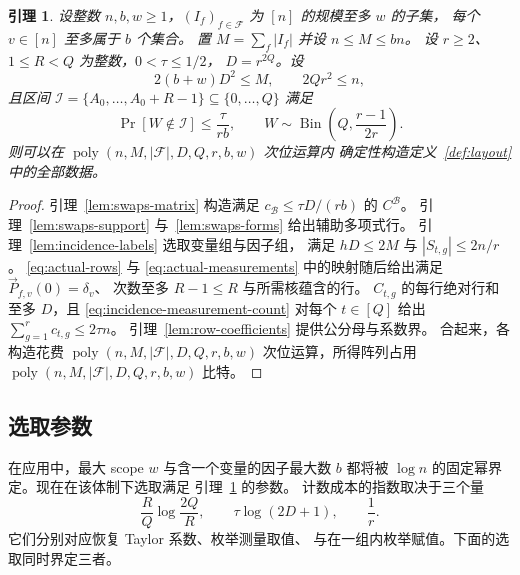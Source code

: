 \documentclass[11pt,reqno]{amsart}
\numberwithin{equation}{section}
\newtheorem{lemma}[theorem]{引理}
\theoremstyle{definition}\newtheorem{definition}[theorem]{定义}
\theoremstyle{remark}\newtheorem{remark}[theorem]{注}
\newcommand{\poly}{\operatorname{poly}}
\renewcommand{\le}{\leqslant}
\renewcommand{\ge}{\geqslant}
\begin{document}
\begin{lemma}\label{lem:layout}
设整数 $n,b,w\ge1$，$(I_f)_{f\in\mathcal F}$
为 $[n]$ 的规模至多 $w$ 的子集，
每个 $v\in[n]$ 至多属于 $b$ 个集合。
置 $M=\sum_f|I_f|$ 并设 $n\le M\le bn$。
设 $r\ge2$、$1\le R<Q$ 为整数，$0<\tau\le1/2$，
$D=r^{2Q}$。设
\[
 2(b+w)D^2\le M,\qquad 2Qr^2\le n,
\]
且区间
$\mathcal I=\{A_0,\ldots,A_0+R-1\}\subseteq\{0,\ldots,Q\}$
满足
\[
 \Pr[W\notin\mathcal I]\le\frac{\tau}{rb},\qquad
 W\sim\operatorname{Bin}\!\left(Q,\frac{r-1}{2r}\right).
\]
则可以在 $\poly(n,M,|\mathcal F|,D,Q,r,b,w)$ 次位运算内
确定性构造定义~\ref{def:layout} 中的全部数据。
\end{lemma}
\begin{proof}
引理~\ref{lem:swaps-matrix} 构造满足
$c_{\mathcal B}\le\tau D/(rb)$ 的 $C^{\mathcal B}$。
引理~\ref{lem:swaps-support} 与~\ref{lem:swaps-forms}
给出辅助多项式行。
引理~\ref{lem:incidence-labels} 选取变量组与因子组，
满足 $hD\le2M$ 与 $|S_{t,g}|\le2n/r$。
\eqref{eq:actual-rows} 与 \eqref{eq:actual-measurements}
中的映射随后给出满足 $\vec{P}_{f,v}(0)=\delta_v$、
次数至多 $R-1\le R$ 与所需核蕴含的行。
$C_{t,g}$ 的每行绝对行和至多 $D$，且
\eqref{eq:incidence-measurement-count} 对每个 $t\in[Q]$
给出 $\sum_{g=1}^r c_{t,g}\le2\tau n$。
引理~\ref{lem:row-coefficients} 提供公分母与系数界。
合起来，各构造花费 $\poly(n,M,|\mathcal F|,D,Q,r,b,w)$
次位运算，所得阵列占用
$\poly(n,M,|\mathcal F|,D,Q,r,b,w)$ 比特。
\end{proof}

\subsection{选取参数}\label{subsec:incidence-parameters}
在应用中，最大 scope $w$ 与含一个变量的因子最大数 $b$
都将被 $\log n$ 的固定幂界定。现在在该体制下选取满足
引理~\ref{lem:layout} 的参数。
计数成本的指数取决于三个量
\[
 \frac RQ\log\frac{2Q}{R},\qquad
 \tau\log(2D+1),\qquad \frac1r.
\]
它们分别对应恢复 Taylor 系数、枚举测量取值、
与在一组内枚举赋值。下面的选取同时界定三者。
\end{document}
